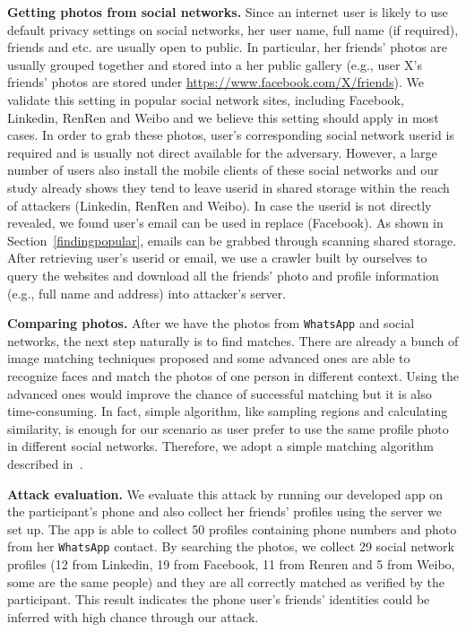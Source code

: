 \documentclass{sig-alternate}
\begin{document}
\vspace{2pt}\noindent\textbf{Getting photos from social networks.}
Since an internet user is likely to use default privacy settings on social networks, her user name, full name (if required), friends and etc. are usually open to public. In particular, her friends' photos are usually grouped together and stored into a her public gallery (e.g., user X's friends' photos are stored under \url{https://www.facebook.com/X/friends}). We validate this setting in popular social network sites, including Facebook, Linkedin, RenRen and Weibo and we believe this setting should apply in most cases. In order to grab these photos, user's corresponding social network userid is required and is usually not direct available for the adversary. However, a large number of users also install the mobile clients of these social networks and our study already shows they tend to leave userid in shared storage within the reach of attackers (Linkedin, RenRen and Weibo). In case the userid is not directly revealed, we found user's email can be used in replace (Facebook). As shown in Section~\ref{findingpopular}, emails can be grabbed through scanning shared storage. After retrieving user's userid or email, we use a crawler built by ourselves to query the websites and download all the friends' photo and profile information (e.g., full name and address) into attacker's server.



\vspace{2pt}\noindent\textbf{Comparing photos.}
After we have the photos from \texttt{WhatsApp} and social networks, the next step naturally is to find matches. There are already a bunch of image matching techniques proposed and some advanced ones are able to recognize faces and match the photos of one person in different context. Using the advanced ones would improve the chance of successful matching but it is also time-consuming. In fact, simple algorithm, like sampling regions and calculating similarity, is enough for our scenario as user prefer to use the same profile photo in different social networks. Therefore, we adopt a simple matching algorithm described in~\cite{picturecompare1}.



\vspace{2pt}\noindent\textbf{Attack evaluation.}
We evaluate this attack by running our developed app on the participant's phone and also collect her friends' profiles using the server we set up. The app is able to collect 50 profiles containing phone numbers and photo from her \texttt{WhatsApp} contact. By searching the photos, we collect 29 social network profiles (12 from Linkedin, 19 from Facebook, 11 from Renren and 5 from Weibo, some are the same people) and they are all correctly matched as verified by the participant. This result indicates the phone user's friends' identities could be inferred with high chance through our attack.
\end{document}
